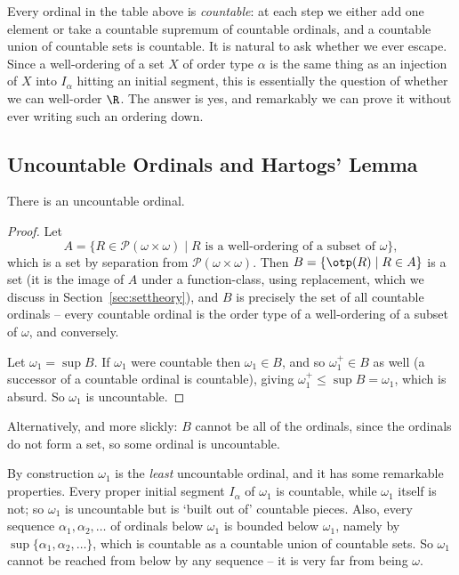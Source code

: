 Every ordinal in the table above is \emph{countable}: at each step we either add one element or take a countable supremum of countable ordinals, and a countable union of countable sets is countable. It is natural to ask whether we ever escape. Since a well-ordering of a set $X$ of order type $\alpha$ is the same thing as an injection of $X$ into $I_\alpha$ hitting an initial segment, this is essentially the question of whether we can well-order $\R$. The answer is yes, and remarkably we can prove it without ever writing such an ordering down.

\subsection{Uncountable Ordinals and Hartogs' Lemma}

\begin{theorem}\label{thm:omega1}
  There is an uncountable ordinal.
\end{theorem}
\begin{proof}
  Let
  $$A = \{R \in \mathcal{P}(\omega \times \omega) \mid R \text{ is a well-ordering of a subset of } \omega\},$$
  which is a set by separation from $\mathcal{P}(\omega\times\omega)$. Then $B = \{\otp(R) \mid R \in A\}$ is a set (it is the image of $A$ under a function-class, using replacement, which we discuss in Section~\ref{sec:settheory}), and $B$ is precisely the set of all countable ordinals -- every countable ordinal is the order type of a well-ordering of a subset of $\omega$, and conversely.

  Let $\omega_1 = \sup B$. If $\omega_1$ were countable then $\omega_1 \in B$, and so $\omega_1^+ \in B$ as well (a successor of a countable ordinal is countable), giving $\omega_1^+ \leq \sup B = \omega_1$, which is absurd. So $\omega_1$ is uncountable.
\end{proof}

Alternatively, and more slickly: $B$ cannot be all of the ordinals, since the ordinals do not form a set, so some ordinal is uncountable.

By construction $\omega_1$ is the \emph{least} uncountable ordinal, and it has some remarkable properties. Every proper initial segment $I_\alpha$ of $\omega_1$ is countable, while $\omega_1$ itself is not; so $\omega_1$ is uncountable but is `built out of' countable pieces. Also, every sequence $\alpha_1, \alpha_2, \dots$ of ordinals below $\omega_1$ is bounded below $\omega_1$, namely by $\sup\{\alpha_1, \alpha_2, \dots\}$, which is countable as a countable union of countable sets. So $\omega_1$ cannot be reached from below by any sequence -- it is very far from being $\omega$.

